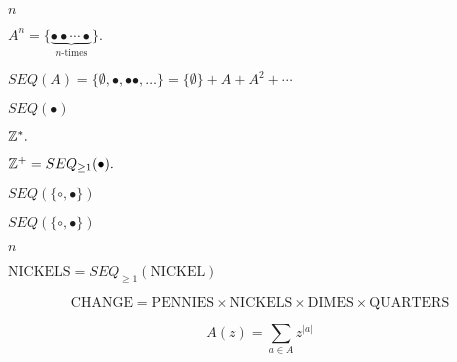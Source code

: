 \documentclass[10pt]{book}
\begin{document}
\begin{mdSnippets}
\begin{mdInlineSnippet}[7b8b965ad4bca0e41ab51de7b31363a1]
$n$\end{mdInlineSnippet}%
\begin{mdInlineSnippet}[2e07a12773ece05d1e72f5791c9df5fd]%
$A^n=\{\underbrace{\bullet\bullet\cdots\bullet}_{n\text{-times}}\}.$\end{mdInlineSnippet}%
\begin{mdInlineSnippet}[1482e22537fdc1c3ad506ab5a015b7d8]%
$SEQ(A)=\{\emptyset, \bullet, \bullet\bullet,\ldots\}=\{\emptyset\}+A+A^2+\cdots$\end{mdInlineSnippet}%
\begin{mdInlineSnippet}[5425a6c466d378d93f810a9b1169a8f2]%
$SEQ(\bullet)$\end{mdInlineSnippet}%
\begin{mdInlineSnippet}[8c6329bf24760e3874d8f5a743a02d89]%
$\mathbb{Z}^*.$\end{mdInlineSnippet}%
\begin{mdInlineSnippet}%
$\mathbb{Z}^+=SEQ_{\geq1}(\bullet).$\end{mdInlineSnippet}%
\begin{mdInlineSnippet}%
$SEQ(\{\circ,\bullet\})$\end{mdInlineSnippet}%
\begin{mdInlineSnippet}%
$SEQ(\{\circ,\bullet\})$\end{mdInlineSnippet}%
\begin{mdInlineSnippet}[7b8b965ad4bca0e41ab51de7b31363a1]%
$n$\end{mdInlineSnippet}%
\begin{mdInlineSnippet}[87e47479257d1b8279f6dc526dbdd10d]%
$\text{NICKELS} = SEQ_{\geq1}(\text{NICKEL})$\end{mdInlineSnippet}%
\begin{mdDisplaySnippet}[9d316fd89176a19114c12915c75a078f]%
\[%
\text{CHANGE} = \text{PENNIES}\times\text{NICKELS}\times\text{DIMES}\times\text{QUARTERS}
\]%
\end{mdDisplaySnippet}%
\begin{mdDisplaySnippet}[de189626c0f468f00af26235752660a7]%
\[%
A(z)=\sum_{a\in A}z^{|a|}
\]%
\end{mdDisplaySnippet}%

\end{mdSnippets}
\end{document}
